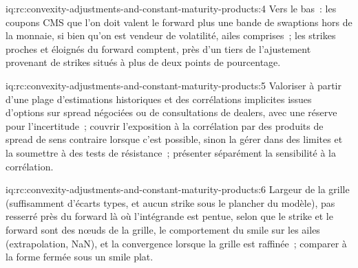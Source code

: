 \begin{solution}{iq:rc:convexity-adjustments-and-constant-maturity-products:4}
Vers le bas~: les coupons CMS que l'on doit valent le forward plus une bande de
swaptions hors de la monnaie, si bien qu'on est vendeur de volatilité, ailes comprises~;
les strikes proches et éloignés du forward comptent, près d'un tiers de
l'ajustement provenant de strikes situés à plus de deux points de pourcentage.
\end{solution}

\begin{solution}{iq:rc:convexity-adjustments-and-constant-maturity-products:5}
Valoriser à partir d'une plage d'estimations historiques et des corrélations implicites
issues d'options sur spread négociées ou de consultations de dealers, avec une réserve pour l'incertitude~;
couvrir l'exposition à la corrélation par des produits de spread de sens contraire lorsque
c'est possible, sinon la gérer dans des limites et la soumettre à des tests de résistance~; présenter
séparément la sensibilité à la corrélation.
\end{solution}

\begin{solution}{iq:rc:convexity-adjustments-and-constant-maturity-products:6}
Largeur de la grille (suffisamment d'écarts types, et aucun strike sous le plancher du modèle),
pas resserré près du forward là où l'intégrande est pentue, selon que le strike et le
forward sont des nœuds de la grille, le comportement du smile sur les ailes (extrapolation,
NaN), et la convergence lorsque la grille est raffinée~; comparer à la forme fermée
sous un smile plat.
\end{solution}
